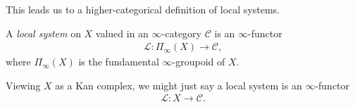 This leads us to a higher-categorical definition of local systems.

\begin{definition} A \textit{local system} on $X$ valued in an $\infty$-category $\mathscr{C}$ is an $\infty$-functor
\begin{align*}
    \mathcal{L} : \Pi_\infty(X) \to \mathscr{C},
\end{align*}
where $\Pi_\infty(X)$ is the fundamental $\infty$-groupoid of $X$.
\end{definition}

Viewing $X$ as a Kan complex, we might just say a local system is an $\infty$-functor
\begin{align*}
    \mathcal{L} : X \to \mathscr{C}.
\end{align*}






